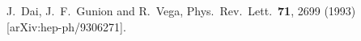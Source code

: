 J.~Dai, J.~F.~Gunion and R.~Vega,
Phys.\ Rev.\ Lett.\  {\bf 71}, 2699 (1993)
[arXiv:hep-ph/9306271].

